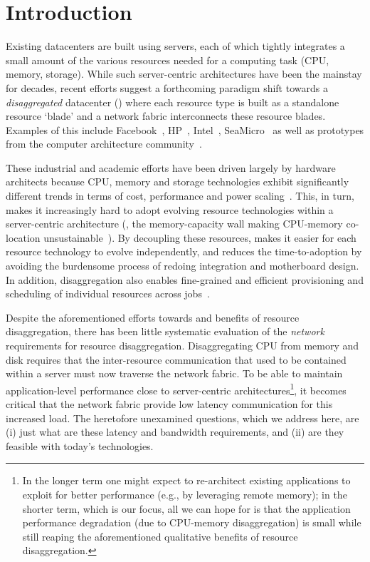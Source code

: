 \vspace{-0.1in}
\section{Introduction}
\label{sec:intro}
\vspace{-0.05in}
Existing datacenters are built using servers, each of which tightly integrates a small amount of the various resources needed for a computing task (CPU, memory, storage). While such server-centric architectures have been the mainstay for decades, recent efforts suggest a forthcoming paradigm shift towards a {\em disaggregated} datacenter (\dis) where each resource type is built as a standalone resource `blade' and a network fabric interconnects these resource blades. Examples of this include Facebook~\cite{fdr}, HP~\cite{hptm}, Intel~\cite{rsa}, SeaMicro~\cite{seamicro} as well as prototypes from the computer architecture community~\cite{firebox, sonuma, ddcHwDesign1}. 

These industrial and academic efforts have been driven largely by hardware architects because CPU, memory and storage technologies exhibit significantly different trends in terms of cost, performance and power scaling~\cite{memristors,nvram,reg-ex-hardware,gpus}. This, in turn, makes it increasingly hard to adopt evolving resource technologies within a server-centric architecture (\eg, the memory-capacity wall making CPU-memory co-location unsustainable~\cite{ddcHwDesign1}). By decoupling these resources, \dis makes it easier for each resource technology to evolve independently, and reduces the time-to-adoption by avoiding the burdensome process of redoing integration and motherboard design. In addition, disaggregation also enables fine-grained and efficient provisioning and scheduling of individual resources across jobs~\cite{hotnets}. 

Despite the aforementioned efforts towards and benefits of resource disaggregation, there has been little systematic evaluation of the \emph{network} requirements for resource disaggregation. Disaggregating CPU from memory and disk requires that the inter-resource communication that used to be contained within a server must now traverse the network fabric. To be able to maintain application-level performance close to server-centric architectures{\footnote{In the longer term one might expect to re-architect existing applications to exploit \dis for better performance (e.g., by leveraging remote memory); in the shorter term, which is our focus, all we can hope for is that the application performance degradation (due to CPU-memory disaggregation) is small while still reaping the aforementioned qualitative benefits of resource disaggregation.}}, it becomes critical that the network fabric provide low latency communication for this increased load. The heretofore unexamined questions, which we address here, are (i) just what are these latency and bandwidth requirements, and (ii) are they feasible with today's technologies.

